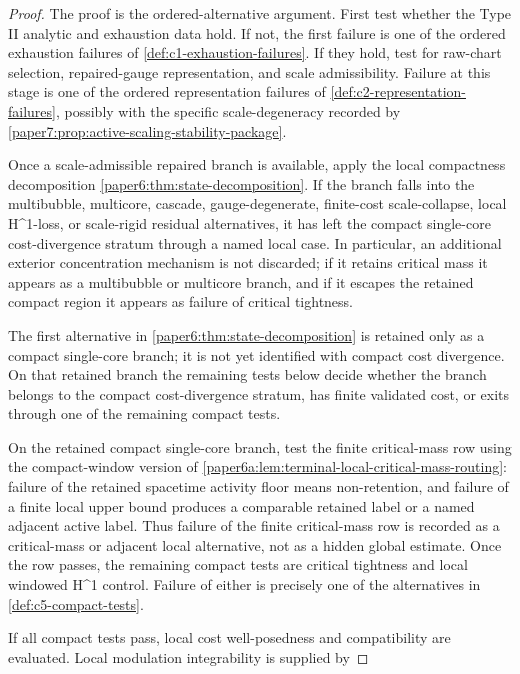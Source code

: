 \documentclass[11pt]{amsart}
\def\({}%
\def\){}%
\theoremstyle{plain}
\theoremstyle{definition}
\theoremstyle{remark}
\begin{document}
\begin{proof}
The proof is the ordered-alternative argument.  First test whether the Type II
analytic and exhaustion data hold.  If not, the first failure is one of the
ordered exhaustion failures of \cref{def:c1-exhaustion-failures}.  If they
hold, test for raw-chart selection, repaired-gauge representation, and scale
admissibility.  Failure at this stage is one of the ordered representation
failures of \cref{def:c2-representation-failures}, possibly with the specific
scale-degeneracy recorded by
\cref{paper7:prop:active-scaling-stability-package}.
\par
Once a scale-admissible repaired branch is available, apply the local
compactness decomposition \cref{paper6:thm:state-decomposition}.  If the branch
falls into the multibubble, multicore, cascade, gauge-degenerate, finite-cost
scale-collapse, local \(H^1\)-loss, or scale-rigid residual alternatives, it has
left the compact single-core cost-divergence stratum through a named local
case.  In particular, an additional exterior concentration mechanism is not
discarded; if it retains critical mass it appears as a multibubble or multicore
branch, and if it escapes the retained compact region it appears as failure of
critical tightness.
\par
The first alternative in \cref{paper6:thm:state-decomposition} is retained only
as a compact single-core branch; it is not yet identified with compact cost
divergence.  On that retained branch the remaining tests below decide whether
the branch belongs to the compact cost-divergence stratum, has finite validated
cost, or exits through one of the remaining compact tests.
\par
On the retained compact single-core branch, test the finite critical-mass row
using the compact-window version of
\cref{paper6a:lem:terminal-local-critical-mass-routing}: failure of the
retained spacetime activity floor means non-retention, and failure of a finite
local upper bound produces
a comparable retained label or a named adjacent active label.  Thus failure of
the finite critical-mass row is recorded as a critical-mass or adjacent local
alternative, not as a hidden global estimate.  Once the row passes, the
remaining compact tests are critical tightness and local windowed \(H^1\)
control.  Failure of either is precisely one of the alternatives in
\cref{def:c5-compact-tests}.
\par
If all compact tests pass, local cost well-posedness and compatibility are
evaluated.  Local modulation integrability is supplied by

\end{proof}
\end{document}
